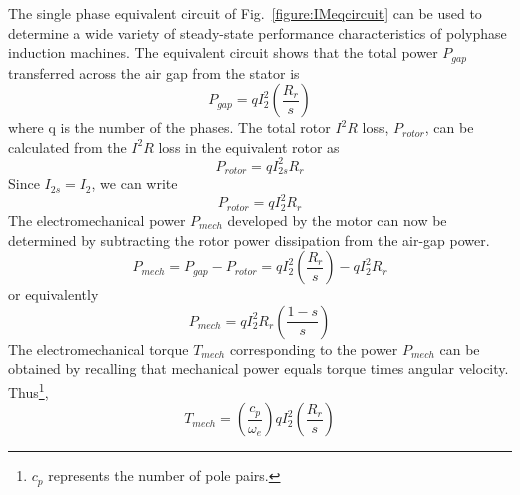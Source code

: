 \documentclass[11pt,a4paper,oneside]{book}
\numberwithin{equation}{section}
\theoremstyle{it}
\theoremstyle{definition}
\begin{document}
The single phase equivalent circuit of Fig.~\ref{figure:IMeqcircuit} can be used to determine a wide variety of steady-state performance characteristics of polyphase induction machines. The equivalent circuit shows that the total power $P_{gap}$ transferred across the air gap from the stator is
\begin{equation} \label{eq12}
	P_{gap}= q I_2^2 \left( \frac{R_r}{s} \right)
\end{equation}
where q is the number of the phases.
The total rotor $I^2R$ loss, $P_{rotor}$, can be calculated from the $I^2R$ loss in the equivalent rotor as
\begin{equation} \label{eq13}
	P_{rotor}= q I_{2s}^2 R_r
\end{equation}
Since $I_{2s}=I_2$, we can write 
\begin{equation} \label{eq14}
	P_{rotor}= q I_{2}^2 R_r
\end{equation}
The electromechanical power $P_{mech}$ developed by the motor can now be determined by subtracting the rotor power dissipation from the air-gap power.
\begin{equation} \label{eq15}
	P_{mech} = P_{gap} - P_{rotor} = q I_{2}^2 \left( \frac{R_r}{s} \right) - q I_{2}^2 R_r
\end{equation} 
or equivalently
\begin{equation} \label{eq16}
	P_{mech} = q I_{2}^2 R_r \left( \frac{1-s}{s} \right)
\end{equation} 
The electromechanical torque $T_{mech}$ corresponding to the power $P_{mech}$ can be obtained by recalling that mechanical power equals torque times angular velocity. Thus\footnote{$c_p$ represents the number of pole pairs.},
\begin{equation} \label{eq17}
	T_{mech} = \left(\frac{c_p}{\omega_e} \right) q I_{2}^2 \left( \frac{R_r}{s} \right)
\end{equation} 
\end{document}

